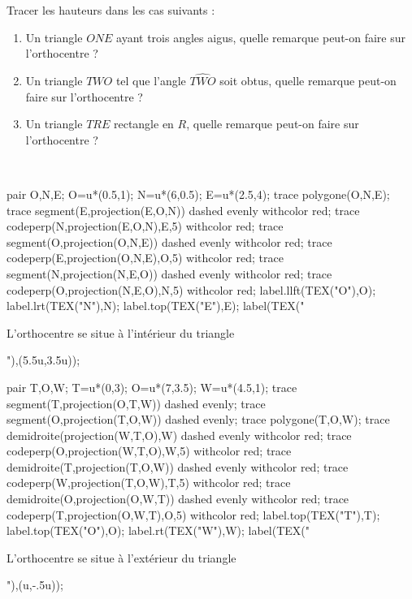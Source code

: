 \begin{exercice*}
   Tracer les hauteurs dans les cas suivants :
   \begin{enumerate}
      \item Un triangle $ONE$ ayant trois angles aigus, quelle remarque peut-on faire sur l'orthocentre ? \smallskip
      \item Un triangle $TWO$ tel que l'angle $\widehat{TWO}$ soit obtus, quelle remarque peut-on faire sur l'orthocentre ? \smallskip
      \item Un triangle $TRE$ rectangle en $R$, quelle remarque peut-on faire sur l'orthocentre ?
   \end{enumerate}
\end{exercice*}

\begin{corrige}
   \ \\ [-5mm]
   \begin{Geometrie}
      pair O,N,E;
      O=u*(0.5,1);
      N=u*(6,0.5);
      E=u*(2.5,4);
      trace polygone(O,N,E);
      trace segment(E,projection(E,O,N)) dashed evenly withcolor red;
      trace codeperp(N,projection(E,O,N),E,5) withcolor red;
      trace segment(O,projection(O,N,E)) dashed evenly withcolor red;
      trace codeperp(E,projection(O,N,E),O,5) withcolor red;
      trace segment(N,projection(N,E,O)) dashed evenly withcolor red;
      trace codeperp(O,projection(N,E,O),N,5) withcolor red;
      label.llft(TEX("O"),O);
      label.lrt(TEX("N"),N);
      label.top(TEX("E"),E);
      label(TEX("\parbox{2.5cm}{L'orthocentre se situe {\red à l'intérieur du triangle}}"),(5.5u,3.5u));
   \end{Geometrie}
      
   \begin{Geometrie}[CoinBG={(-0.5u,-3u)}]
      pair T,O,W;
      T=u*(0,3);
      O=u*(7,3.5);
      W=u*(4.5,1);
      trace segment(T,projection(O,T,W)) dashed evenly;
      trace segment(O,projection(T,O,W)) dashed evenly;
      trace polygone(T,O,W);
      trace demidroite(projection(W,T,O),W) dashed evenly withcolor red;
      trace codeperp(O,projection(W,T,O),W,5) withcolor red;
      trace demidroite(T,projection(T,O,W)) dashed evenly withcolor red;
      trace codeperp(W,projection(T,O,W),T,5) withcolor red;
      trace demidroite(O,projection(O,W,T)) dashed evenly withcolor red;
      trace codeperp(T,projection(O,W,T),O,5) withcolor red;
      label.top(TEX("T"),T);
      label.top(TEX("O"),O);
      label.rt(TEX("W"),W);
      label(TEX("\parbox{2.5cm}{L'orthocentre se situe {\red à l'extérieur du triangle}}"),(u,-.5u));
   \end{Geometrie}


\end{corrige}
